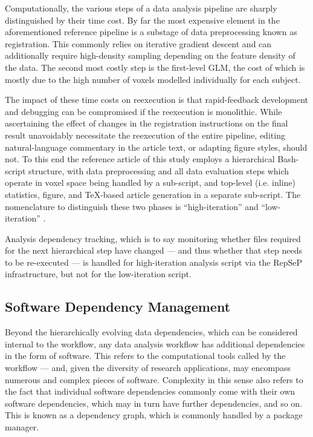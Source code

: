 Computationally, the various steps of a data analysis pipeline are sharply distinguished by their time cost.
By far the most expensive element in the aforementioned reference pipeline is a substage of data preprocessing known as registration.
This commonly relies on iterative gradient descent and can additionally require high-density sampling depending on the feature density of the data.
The second most costly step is the first-level GLM, the cost of which is mostly due to the high number of voxels modelled individually for each subject.

The impact of these time costs on reexecution is that rapid-feedback development and debugging can be compromised if the reexecution is monolithic.
While ascertaining the effect of changes in the registration instructions on the final result unavoidably necessitate the reexecution of the entire pipeline, editing natural-language commentary in the article text, or adapting figure styles, should not.
To this end the reference article of this study employs a hierarchical Bash-script structure, with data preprocessing and all data evaluation steps which operate in voxel space being handled by a sub-script, and top-level (i.e. inline) statistics, figure, and TeX-based article generation in a separate sub-script.
The nomenclature to distinguish these two phases is “high-iteration” and “low-iteration” \supercite{repsep}.

Analysis dependency tracking, which is to say monitoring whether files required for the next hierarchical step have changed — and thus whether that step needs to be re-executed — is handled for high-iteration analysis script via the RepSeP infrastructure, but not for the low-iteration script.


\subsection{Software Dependency Management}

Beyond the hierarchically evolving data dependencies, which can be considered internal to the workflow, any data analysis workflow has additional dependencies in the form of software.
This refers to the computational tools called by the workflow — and, given the diversity of research applications, may encompass numerous and complex pieces of software.
Complexity in this sense also refers to the fact that individual software dependencies commonly come with their own software dependencies, which may in turn have further dependencies, and so on.
This is known as a dependency graph, which is commonly handled by a package manager.

